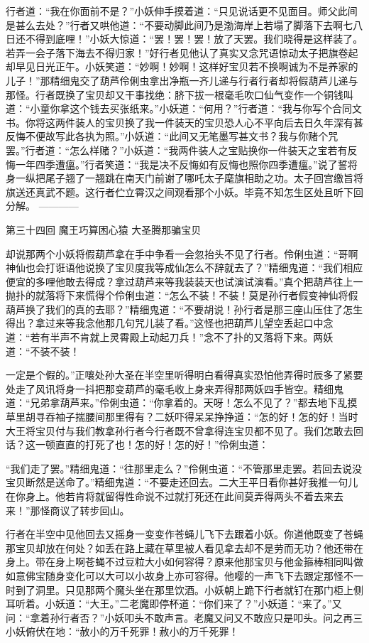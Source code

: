 \documentclass[12pt,UTF8]{ctexbook}
\begin{document}
行者道：“我在你面前不是？”小妖伸手摸着道：“只见说话更不见面目。师父此间是甚么去处？”行者又哄他道：“不要动脚此间乃是渤海岸上若塌了脚落下去啊七八日还不得到底哩！”小妖大惊道：“罢！罢！罢！放了天罢。我们晓得是这样装了。若弄一会子落下海去不得归家！”好行者见他认了真实又念咒语惊动太子把旗卷起却早见日光正午。小妖笑道：“妙啊！妙啊！这样好宝贝若不换啊诚为不是养家的儿子！”那精细鬼交了葫芦伶俐虫拿出净瓶一齐儿递与行者行者却将假葫芦儿递与那怪。行者既换了宝贝却又干事找绝：脐下拔一根毫毛吹口仙气变作一个铜钱叫道：“小童你拿这个钱去买张纸来。”小妖道：“何用？”行者道：“我与你写个合同文书。你将这两件装人的宝贝换了我一件装天的宝贝恐人心不平向后去日久年深有甚反悔不便故写此各执为照。”小妖道：“此间又无笔墨写甚文书？我与你赌个咒罢。”行者道：“怎么样赌？”小妖道：“我两件装人之宝贴换你一件装天之宝若有反悔一年四季遭瘟。”行者笑道：“我是决不反悔如有反悔也照你四季遭瘟。”说了誓将身一纵把尾子翘了一翘跳在南天门前谢了哪吒太子麾旗相助之功。太子回宫缴旨将旗送还真武不题。这行者伫立霄汉之间观看那个小妖。毕竟不知怎生区处且听下回分解。
------------

第三十四回 魔王巧算困心猿 大圣腾那骗宝贝

却说那两个小妖将假葫芦拿在手中争看一会忽抬头不见了行者。伶俐虫道：“哥啊神仙也会打诳语他说换了宝贝度我等成仙怎么不辞就去了？”精细鬼道：“我们相应便宜的多哩他敢去得成？拿过葫芦来等我装装天也试演试演看。”真个把葫芦往上一抛扑的就落将下来慌得个伶俐虫道：“怎么不装！不装！莫是孙行者假变神仙将假葫芦换了我们的真的去耶？”精细鬼道：“不要胡说！孙行者是那三座山压住了怎生得出？拿过来等我念他那几句咒儿装了看。”这怪也把葫芦儿望空丢起口中念道：“若有半声不肯就上灵霄殿上动起刀兵！”念不了扑的又落将下来。两妖道：“不装不装！

一定是个假的。”正嚷处孙大圣在半空里听得明白看得真实恐怕他弄得时辰多了紧要处走了风讯将身一抖把那变葫芦的毫毛收上身来弄得那两妖四手皆空。精细鬼道：“兄弟拿葫芦来。”伶俐虫道：“你拿着的。天呀！怎么不见了？”都去地下乱摸草里胡寻吞袖子揣腰间那里得有？二妖吓得呆呆挣挣道：“怎的好！怎的好！当时大王将宝贝付与我们教拿孙行者今行者既不曾拿得连宝贝都不见了。我们怎敢去回话？这一顿直直的打死了也！怎的好！怎的好！”伶俐虫道：

“我们走了罢。”精细鬼道：“往那里走么？”伶俐虫道：“不管那里走罢。若回去说没宝贝断然是送命了。”精细鬼道：“不要走还回去。二大王平日看你甚好我推一句儿在你身上。他若肯将就留得性命说不过就打死还在此间莫弄得两头不着去来去来！”那怪商议了转步回山。

行者在半空中见他回去又摇身一变变作苍蝇儿飞下去跟着小妖。你道他既变了苍蝇那宝贝却放在何处？如丢在路上藏在草里被人看见拿去却不是劳而无功？他还带在身上。带在身上啊苍蝇不过豆粒大小如何容得？原来他那宝贝与他金箍棒相同叫做如意佛宝随身变化可以大可以小故身上亦可容得。他嘤的一声飞下去跟定那怪不一时到了洞里。只见那两个魔头坐在那里饮酒。小妖朝上跪下行者就钉在那门柜上侧耳听着。小妖道：“大王。”二老魔即停杯道：“你们来了？”小妖道：“来了。”又问：“拿着孙行者否？”小妖叩头不敢声言。老魔又问又不敢应只是叩头。问之再三小妖俯伏在地：“赦小的万千死罪！赦小的万千死罪！
\end{document}
